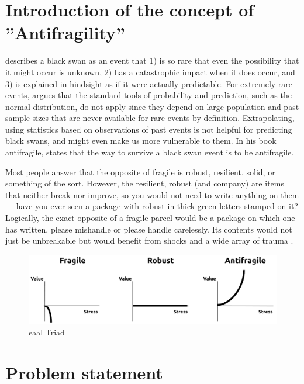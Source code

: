 \section{Introduction of the concept of ''Antifragility''}
\label{sec:introantifragility}
\textcite{Taleb2008} describes a black swan as an event that 1) is so rare that even the possibility that it might occur is unknown, 2) has a catastrophic impact when it does occur, and 3) is explained in hindsight as if it were actually predictable. For extremely rare events, \citeauthor{Taleb2008} argues that the standard tools of probability and prediction, such as the normal distribution, do not apply since they depend on large population and past sample sizes that are never available for rare events by definition. Extrapolating, using statistics based on observations of past events is not helpful for predicting black swans, and might even make us more vulnerable to them. In his book \Gls{antifragile}, \textcite{Taleb2012} states that the way to survive a black swan event is to be \gls{antifragile}.\par
Most people answer that the opposite of \gls{fragile} is \gls{robust}, \gls{resilient}, solid, or something of the sort. However, the \gls{resilient}, \gls{robust} (and company) are items that neither break nor improve, so you would not need to write anything on them — have you ever seen a package with \gls{robust} in thick green letters stamped on it? Logically, the exact opposite of a \gls{fragile} parcel would be a package on which one has written, please mishandle or please handle carelessly. Its contents would not just be unbreakable but would benefit from shocks and a wide array of trauma \parencite{Taleb2012}.

\begin{figure}[h!]
	\centering
	\includegraphics[width=0.7\linewidth]{images/eaal-triad}
	\caption[EAAL Triad]{\acrshort{eaal} Triad \parencite{Botjes2020}}
	\label{fig:eaal-triad}
\end{figure}

\section{Problem statement}
\label{sec:problemstatement}


